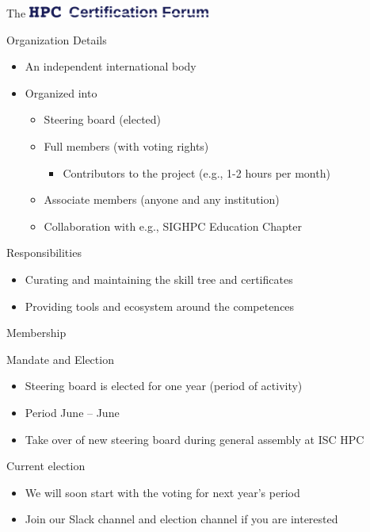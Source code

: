 \documentclass[compress,aspectratio=169]{beamer}
\begin{document}
\begin{frame}{The \includegraphics[width=0.45\textwidth]{hpccf-full}}

	\begin{block}{Organization Details}
		\begin{itemize}
			\item An independent international body
			\item Organized into
				\begin{itemize}
					\item Steering board (elected)
					\item Full members (with voting rights)
            \begin{itemize}
              \item Contributors to the project (e.g., 1-2 hours per month)
            \end{itemize}
					\item Associate members (anyone and any institution)
          \item Collaboration with e.g., SIGHPC Education Chapter
				\end{itemize}
		\end{itemize}
	\end{block}

	\begin{block}{Responsibilities}
		\begin{itemize}
			\item Curating and maintaining the skill tree and certificates
			\item Providing tools and ecosystem around the competences
		\end{itemize}
	\end{block}
\end{frame}

\begin{frame}{Membership}

  \begin{block}{Mandate and Election}
  \begin{itemize}
  \item Steering board is elected for one year (period of activity)
  \item Period June -- June
  \item Take over of new steering board during general assembly at ISC HPC
  \end{itemize}
  \end{block}

  \begin{block}{Current election}
  \begin{itemize}
  \item We will soon start with the voting for next year's period
  \item Join our Slack channel and election channel if you are interested
  \end{itemize}
  \end{block}
\end{frame}
\end{document}
